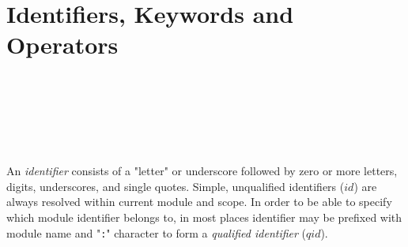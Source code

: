 \section{Identifiers, Keywords and Operators}

\begin{bnf}
    \eq {} \\
   \eq {} \  \\
  \\
   \eq
        \gor   {}
        \gor   {}
        \gor   {}
        \gor   {}
        \gor   {}
        \gorln {}
        \gor   {}
        \gor   {}
        \gor   {}
        \gor   {}
        \gor   {}
        \gor   {}
        \gor   {}
        \gorln {}
        \gor   {}
        \gor   {}
        \gor   {}
        \gor   {}
        \gor   {}
        \gor   {}
        \gor   {}
        \gorln {}
        \gor   {}
        \gor   {}
        \gor   {}
        \gor   {}
        \gor   \term{\_} \\
  \\
   \eq
                \term{+}
         \gor   \term{-}
         \gor   \term{*}
         \gor   \term{/}
         \gorln \term{(}
         \gor   \term{)}
         \gor   \term{[}
         \gor   \term{]}
         \gor   \term{\{}
         \gor   \term{\}}
         \gor   \term{:}
         \gor   \term{;}
         \gorln \term{==}
         \gor   \term{<}
         \gor   \term{<=}
         \gor   \term{>}
         \gor   \term{>=}
         \gorln \term{:=}
         \gor   \term{<-}
         \gor   \term{\$}
         \gor   \term{\%}
\end{bnf}

An \emph{identifier} consists of a "letter" or underscore followed by zero or more letters, digits, underscores, and single quotes. Simple, unqualified identifiers (\(id\)) are always resolved within current module and scope. In order to be able to specify which module identifier belongs to, in most places identifier may be prefixed with module name and "\texttt{:}" character to form a \emph{qualified identifier} (\(qid\)).

